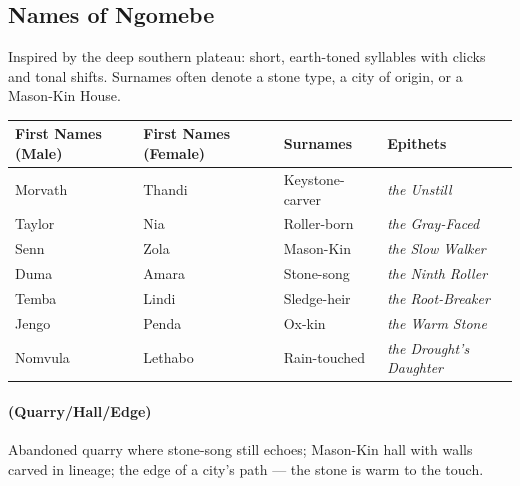 \subsection*{Names of Ngomebe}
\label{sec:ngomebe-names}

Inspired by the deep southern plateau: short, earth-toned syllables with clicks and tonal shifts. Surnames often denote a stone type, a city of origin, or a Mason-Kin House.

\begin{longtable}{|p{}|p{}|p{}|p{}|}
\hline
\textbf{First Names (Male)} & \textbf{First Names (Female)} & \textbf{Surnames} & \textbf{Epithets} \\
\hline
Morvath & Thandi & Keystone-carver & \textit{the Unstill} \\
\hline
Taylor & Nia & Roller-born & \textit{the Gray-Faced} \\
\hline
Senn & Zola & Mason-Kin & \textit{the Slow Walker} \\
\hline
Duma & Amara & Stone-song & \textit{the Ninth Roller} \\
\hline
Temba & Lindi & Sledge-heir & \textit{the Root-Breaker} \\
\hline
Jengo & Penda & Ox-kin & \textit{the Warm Stone} \\
\hline
Nomvula & Lethabo & Rain-touched & \textit{the Drought's Daughter} \\
\hline
\end{longtable}

\paragraph*{(Quarry/Hall/Edge)} Abandoned quarry where stone-song still echoes; Mason-Kin hall with walls carved in lineage; the edge of a city's path --- the stone is warm to the touch.

